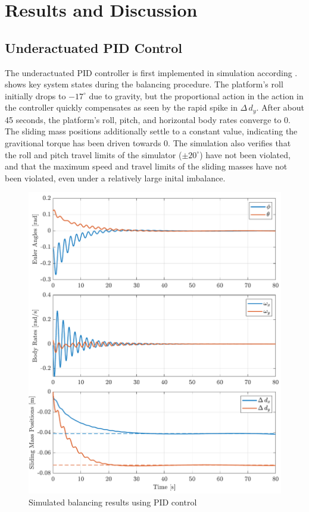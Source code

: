 \chapter{Results and Discussion}



\section{Underactuated PID Control}\label{sec:PID_results}

The underactuated PID controller is first implemented in simulation according .  shows key system states during the balancing procedure. The platform's roll initially drops to $-17^{\circ}$ due to gravity, but the proportional action in the action in the controller quickly compensates as seen by the rapid spike in $\Delta\,d_y$. After about 45 seconds, the platform's roll, pitch, and horizontal body rates converge to 0. The sliding mass positions additionally settle to a constant value, indicating the gravitional torque has been driven towards 0. The simulation also verifies that the roll and pitch travel limits of the simulator ($\pm20^{\circ}$) have not been violated, and that the maximum speed and travel limits of the sliding masses have not been violated, even under a relatively large inital imbalance.

\begin{figure}[p!]
    \centering
    \includegraphics[width=\linewidth]{plots/PID_sim_results.pdf}
    \caption{Simulated balancing results using PID control}
    \label{fig:PID_sim_results}
\end{figure}

